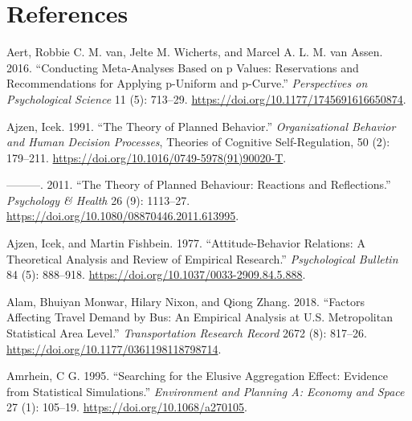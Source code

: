\documentclass[
  11pt,
  openany]{memoir}
\newlength{\cslhangindent}
\newlength{\cslentryspacingunit} %
\newenvironment{CSLReferences}[2] %
 {%
  \setlength{\parindent}{0pt}
  \ifodd #1
  \let\oldpar\par
  \def\par{\hangindent=\cslhangindent\oldpar}
  \fi
  \setlength{\parskip}{#2\cslentryspacingunit}
 }%
 {}
\begin{document}
\hypertarget{references}{%
\chapter*{References}\label{references}}

\hypertarget{refs}{}
\begin{CSLReferences}{1}{0}
\leavevmode{}%
Aert, Robbie C. M. van, Jelte M. Wicherts, and Marcel A. L. M. van Assen. 2016. {``Conducting {Meta}-{Analyses Based} on p {Values}: Reservations and {Recommendations} for {Applying} p-{Uniform} and p-{Curve}.''} \emph{Perspectives on Psychological Science} 11 (5): 713--29. \url{https://doi.org/10.1177/1745691616650874}.

\leavevmode{}%
Ajzen, Icek. 1991. {``The Theory of Planned Behavior.''} \emph{Organizational Behavior and Human Decision Processes}, Theories of {Cognitive Self}-{Regulation}, 50 (2): 179--211. \url{https://doi.org/10.1016/0749-5978(91)90020-T}.

\leavevmode{}%
---------. 2011. {``The Theory of Planned Behaviour: Reactions and Reflections.''} \emph{Psychology \& Health} 26 (9): 1113--27. \url{https://doi.org/10.1080/08870446.2011.613995}.

\leavevmode{}%
Ajzen, Icek, and Martin Fishbein. 1977. {``Attitude-Behavior Relations: A Theoretical Analysis and Review of Empirical Research.''} \emph{Psychological Bulletin} 84 (5): 888--918. \url{https://doi.org/10.1037/0033-2909.84.5.888}.

\leavevmode{}%
Alam, Bhuiyan Monwar, Hilary Nixon, and Qiong Zhang. 2018. {``Factors {Affecting Travel Demand} by {Bus}: An {Empirical Analysis} at {U}.{S}. {Metropolitan Statistical Area Level}.''} \emph{Transportation Research Record} 2672 (8): 817--26. \url{https://doi.org/10.1177/0361198118798714}.

\leavevmode{}%
Amrhein, C G. 1995. {``Searching for the {Elusive Aggregation Effect}: Evidence from {Statistical Simulations}.''} \emph{Environment and Planning A: Economy and Space} 27 (1): 105--19. \url{https://doi.org/10.1068/a270105}.


\end{CSLReferences}
\end{document}
